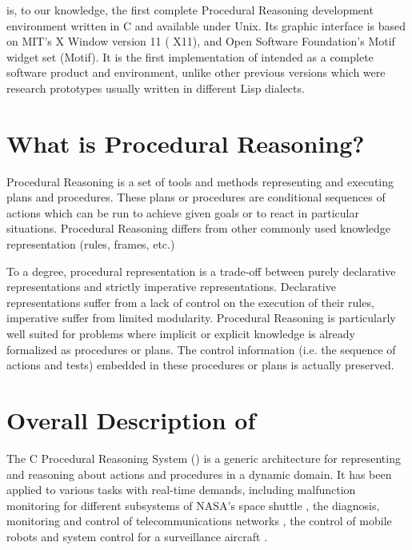 \COPRSDE{} is, to our knowledge, the first complete Procedural Reasoning
development environment written in C and available under Unix. Its graphic
interface is based on MIT's X Window version 11 ( X11), and
Open Software Foundation's Motif widget set (Motif).
It is the first implementation of \OPRS{} intended as a
complete software product and environment, unlike other previous versions
which were research prototypes usually written in different Lisp dialects.



\section{What is Procedural Reasoning?}

Procedural Reasoning is a set of tools and methods representing and executing
plans and procedures. These plans or procedures are conditional sequences of
actions which can be run to achieve given goals or to react in particular
situations. Procedural Reasoning differs from other commonly used knowledge
representation (rules, frames, etc.)

To a degree, procedural representation is a trade-off between purely
declarative representations and strictly imperative representations. Declarative 
representations suffer from a lack of control on the execution of their rules, imperative
suffer from limited modularity. Procedural Reasoning is particularly well suited
for problems where implicit or explicit knowledge is already formalized as
procedures or plans. The control information (i.e. the sequence of actions and
tests) embedded in these procedures or plans is actually preserved.

\section{Overall Description of \COPRS{}}

The C Procedural Reasoning System (\COPRS{}) is a generic architecture for
representing and reasoning about actions and procedures in a dynamic domain. It
has been applied to various tasks with real-time demands, including malfunction
monitoring for different subsystems of NASA's space shuttle
\cite{Georgeff-Ingrand90-a}, the diagnosis, monitoring and control of
telecommunications networks \cite{Wesley91}, the control of  mobile robots
\cite{Revillod92} and system control for a surveillance aircraft
\cite{Ingrand89}.

